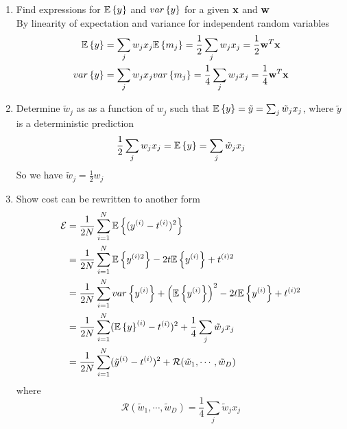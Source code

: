 \documentclass[11pt]{article}
\begin{document}
\begin{enumerate}
\begin{enumerate}
    \item Find expressions for $\mathbb{E}\left\{y\right\}$ and $var\left\{y\right\}$ for a given $\mathbf{x}$ and $\mathbf{w}$\\
    By linearity of expectation and variance for independent random variables 
    \begin{align*}
        \mathbb{E}\left\{y\right\} &= \sum_j w_j x_j \mathbb{E}\left\{m_j\right\} = \frac{1}{2} \sum_j w_j x_j = \frac{1}{2} \mathbf{w}^T \mathbf{x}\\
        var\left\{y\right\} &= \sum_j w_j x_j var\left\{m_j\right\} = \frac{1}{4} \sum_j w_j x_j = \frac{1}{4} \mathbf{w}^T \mathbf{x} \\ 
    \end{align*}
    \item Determine $\tilde{w}_j$ as as a function of $w_j$ such that $\mathbb{E}\left\{y\right\} = \tilde{y} =  \sum_j \tilde{w}_j x_j$, where $\tilde{y}$ is a deterministic prediction
    \[
        \frac{1}{2} \sum_j w_j x_j = \mathbb{E}\left\{y\right\} = \sum_j \tilde{w}_j x_j   
    \]
    So we have $\tilde{w}_j = \frac{1}{2} w_j$ 
    \item Show cost can be rewritten to another form 
    \begin{align*}
        \mathcal{E} 
        &= \frac{1}{2N} \sum_{i=1}^N \mathbb{E}\left\{(y^{(i)} - t^{(i)})^2\right\} \\ 
        &= \frac{1}{2N} \sum_{i=1}^N \mathbb{E}\left\{y^{(i)2}\right\} - 2t\mathbb{E}\left\{y^{(i)}\right\} + t^{(i)2} \\ 
        &= \frac{1}{2N} \sum_{i=1}^N var\left\{y^{(i)}\right\} + \left(\mathbb{E}\left\{y^{(i)}\right\}\right)^2 - 2t\mathbb{E}\left\{y^{(i)}\right\} + t^{(i)2} \\ 
        &= \frac{1}{2N} \sum_{i=1}^N (\mathbb{E}\left\{y\right\}^{(i)} - t^{(i)})^2 + \frac{1}{4}\sum_j \tilde{w}_j x_j \\ 
        &= \frac{1}{2N} \sum_{i=1}^N (\tilde{y}^{(i)} - t^{(i)})^2 + \mathcal{R}(\tilde{w}_1, \cdots, \tilde{w}_D) \\ 
    \end{align*}
    where 
    \[
        \mathcal{R}(\tilde{w}_1, \cdots, \tilde{w}_D) = \frac{1}{4}\sum_j \tilde{w}_j x_j
    \]
\end{enumerate}

\end{enumerate}
\end{document}
